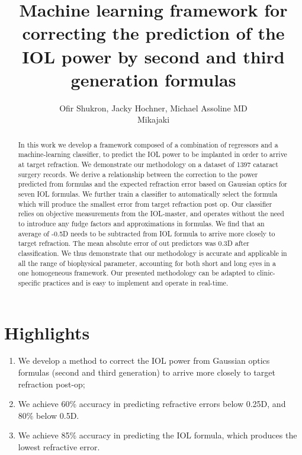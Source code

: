 \documentclass[article,twocolumn,preprint,10pt]{paper}%
\renewcommand{\(}{\left(}
\renewcommand{\)}{\right)}
\renewcommand{\[}{\left[}
\renewcommand{\]}{\right]}
\newcommand{\1}{\mbox{\boldmath$1$}}
\begin{document}
	\title{Machine learning framework for correcting the prediction of the IOL power by second and third generation formulas\\}
    \author{Ofir Shukron, Jacky Hochner, Michael Assoline MD\\Mikajaki}
	\maketitle
	\section{Highlights}
	\begin{enumerate}
		\item We develop a method to correct the IOL power from Gaussian optics formulas  (second and third generation) to arrive more closely to target refraction post-op;
		\item We achieve 60\% accuracy in predicting refractive errors below 0.25D, and 80\% below 0.5D. 
		\item We achieve 85\% accuracy in predicting the IOL formula, which produces the lowest refractive error.
	\end{enumerate}

	\begin{abstract}
		In this work we develop a framework composed of a combination of regressors and a machine-learning classifier, to predict the IOL power to be implanted in order to arrive at target refraction. We demonstrate our methodology on a dataset of 1397 cataract surgery records. We derive a relationship between the correction to the power predicted from formulas and the expected refraction error based on Gaussian optics for seven IOL formulas. We further train a classifier to automatically select the formula which will produce the smallest error from target refraction post op. Our classifier relies on objective measurements from the IOL-master, and operates without the need to introduce any fudge factors and approximations in formulas. We find that an average of -0.5D needs to be subtracted from IOL formula to arrive more closely to target refraction. The mean absolute error of out predictors was 0.3D after classification. We thus demonstrate that our methodology is accurate and applicable in all the range of biophysical parameter, accounting for both short and long eyes in a one homogeneous framework.  Our presented methodology can be adapted to clinic-specific practices and is easy to implement and operate in real-time.
	\end{abstract}
\end{document}
